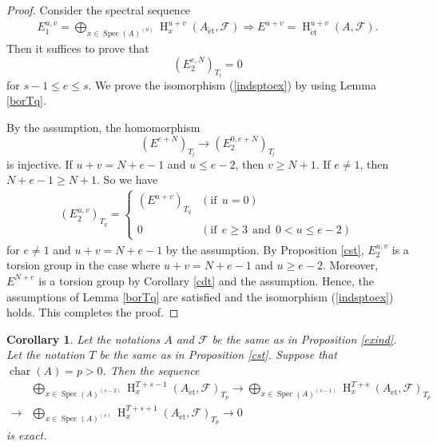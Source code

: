 \documentclass{article}
\newtheorem{cor}[thm]{\indent \sc Corollary}
\newcommand{\spec}{\operatorname{Spec}}
\newcommand{\et}{\mathrm{\acute{e}t}}
\newcommand{\HO}{\operatorname{H}}
\begin{document}
%
\begin{proof}\upshape
Consider the spectral sequence
%
\begin{align*}
E^{u, v}_{1}
=
\displaystyle
\bigoplus_{x\in \spec(A)^{(u)}}
\HO^{u+v}_{x}(A_{\et}, \mathcal{F})
\Rightarrow
E^{u+v}=
\HO^{u+v}_{\et}(A, \mathcal{F}).
\end{align*}
%
Then it suffices to prove that
%
\begin{equation}\label{indsptoex}
(E^{e, N}_{2})_{T_{l}}=0    
\end{equation}
%
for $s-1\leq e\leq s$.
We prove the isomorphism (\ref{indsptoex}) by using Lemma \ref{borTq}. 

By the assumption, 
the homomorphism
%
\begin{equation*}
(E^{e+N})_{T_{l}}
\to
(E^{0, e+N}_{2})_{T_{l}}
\end{equation*}
%
is injective.
If 
$u+v=N+e-1$ and $u\leq e-2$,
then $v\geq N+1$. If $e\neq 1$,
then $N+e-1\geq N+1$. So we have
%
%
\begin{align*}
(E^{u, v}_{2})_{T_{q}}
=
%
\begin{cases}
(E^{u+v})_{T_{q}}
& (\textrm{if}~~u=0) \\
\\
0
& (\textrm{if}~~e\geq 3~~\textrm{and}~~0<u\leq e-2)
\end{cases}
%
\end{align*}
%
for $e\neq 1$ and $u+v=N+e-1$ by the assumption.
By Proposition \ref{cst}, $E^{u, v}_{2}$ is a torsion group in the case where
$u+v=N+e-1$ and $u\geq e-2$. Moreover,
$E^{N+e}$ is a torsion group by
Corollary \ref{cdt} and the assumption.
Hence, the assumptions of Lemma \ref{borTq} are satisfied 
and the isomorphism (\ref{indsptoex}) holds.
This completes the proof.
\end{proof}
%

%
\begin{cor}\upshape
Let the notations $A$ and $\mathcal{F}$ be the same as 
in Proposition \ref{exind}. 
Let the notation $T$ be the same as in Proposition \ref{cst}.
Suppose that $\operatorname{char}(A)=p>0$. Then the sequence 
%
\begin{align*}
&\bigoplus_{x\in \spec(A)^{(s-2)}} 
\HO^{T+s-1}_{x}(A_{\et}, \mathcal{F})_{T_{p}}
\to
\bigoplus_{x\in \spec(A)^{(s-1)}} 
\HO^{T+s}_{x}(A_{\et}, \mathcal{F})_{T_{p}} 
\\
\to&
\bigoplus_{x\in \spec(A)^{(s)}} 
\HO^{T+s+1}_{x}(A_{\et}, \mathcal{F})_{T_{p}}
\to
0
\end{align*}
%
is exact.
\end{cor}
%
\end{document}
